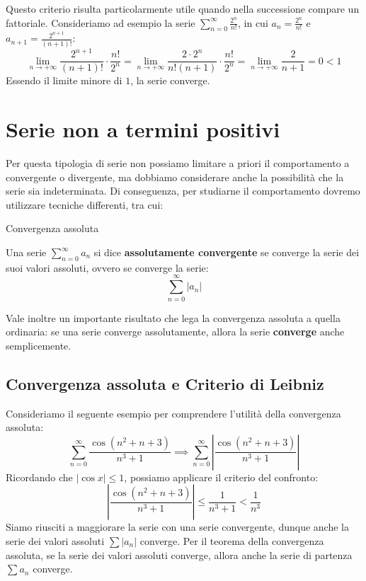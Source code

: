 \documentclass[12pt]{report}
\begin{document}
	Questo criterio risulta particolarmente utile quando nella successione compare un fattoriale. Consideriamo ad esempio la serie $\sum_{n=0}^{\infty} \frac{2^n}{n!}$, in cui $a_n = \frac{2^n}{n!}$ e $a_{n+1} = \frac{2^{n+1}}{(n+1)!}$:
	\[
	\lim_{n \to +\infty} \frac{2^{n+1}}{(n+1)!} \cdot \frac{n!}{2^n} = \lim_{n \to +\infty} \frac{2 \cdot 2^n}{n!(n+1)} \cdot \frac{n!}{2^n} = \lim_{n \to +\infty} \frac{2}{n+1} = 0 < 1
	\]
	Essendo il limite minore di $1$, la serie converge.
	
	\section{Serie non a termini positivi}
	
	Per questa tipologia di serie non possiamo limitare a priori il comportamento a convergente o divergente, ma dobbiamo considerare anche la possibilità che la serie sia indeterminata. Di conseguenza, per studiarne il comportamento dovremo utilizzare tecniche differenti, tra cui:
	
	\begin{definizione}{Convergenza assoluta}{}
		
		Una serie $\sum_{n=0}^{\infty} a_n$ si dice \textbf{assolutamente convergente} se converge la serie dei suoi valori assoluti, ovvero se converge la serie:
		\[
		\sum_{n=0}^{\infty} |a_n|
		\]
		
	\end{definizione}
	
	Vale inoltre un importante risultato che lega la convergenza assoluta a quella ordinaria: se una serie converge assolutamente, allora la serie \textbf{converge} anche semplicemente.
	
	\subsection{Convergenza assoluta e Criterio di Leibniz}
	
	Consideriamo il seguente esempio per comprendere l'utilità della convergenza assoluta:
	\[
	\sum_{n=0}^{\infty} \frac{\cos(n^2+n+3)}{n^3+1} \implies \sum_{n=0}^{\infty} \left| \frac{\cos(n^2+n+3)}{n^3+1} \right|
	\]
	Ricordando che $|\cos x| \le 1$, possiamo applicare il criterio del confronto:
	\[
	\left| \frac{\cos(n^2+n+3)}{n^3+1} \right| \le \frac{1}{n^3+1} < \frac{1}{n^3}
	\]
	Siamo riusciti a maggiorare la serie con una serie convergente, dunque anche la serie dei valori assoluti $\sum |a_n|$ converge. Per il teorema della convergenza assoluta, se la serie dei valori assoluti converge, allora anche la serie di partenza $\sum a_n$ converge.
	
\end{document}
